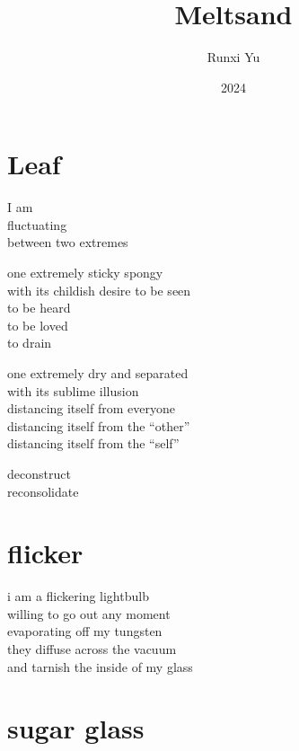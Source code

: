 \documentclass[parskip=half-,12pt,oneside,openany,a5paper,numbers=endperiod]{scrbook}
\begin{document}
\title{Meltsand}
\author{Runxi Yu}
\date{2024}
\maketitle
\tableofcontents

\chapter{Leaf}

I am\\
\hphantom{I am} fluctuating\\
\hphantom{I am fluctuating} between two extremes

one extremely sticky spongy\\
\hspace*{2em}with its childish desire to be seen\\
\hspace*{4em}to be heard\\
\hspace*{6em}to be loved\\
\hspace*{8em}to drain

one extremely dry and separated\\
\hspace*{2em}with its sublime illusion\\
\hspace*{4em}distancing itself from everyone\\
\hspace*{6em}distancing itself from the ``other''\\
\hspace*{8em}distancing itself from the ``self''

deconstruct\\
reconsolidate

\chapter{flicker}

i am a flickering lightbulb\\
willing to go out any moment\\
evaporating off my tungsten\\
they diffuse across the vacuum\\
and tarnish the inside of my glass

\chapter{sugar glass}
\end{document}
